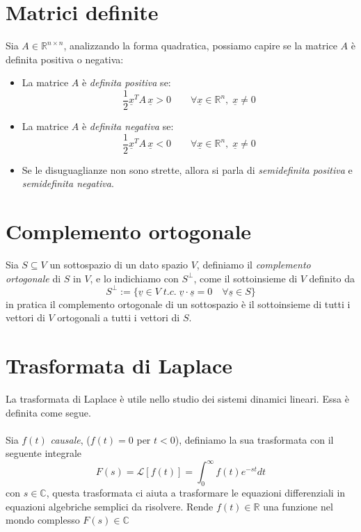 \section{Matrici definite}
Sia $A \in\mathbb{R}^{n \times n}$, analizzando la forma quadratica, possiamo capire se la matrice $A$ è definita positiva o negativa:
\begin{itemize}
	\item La matrice $A$ è \emph{definita positiva} se:
	\begin{equation}
		\frac{1}{2}\underline{x}^TA\,\underline{x} > 0 \qquad\forall\underline{x}\in\mathbb{R}^n,\; \underline{x} \neq 0
	\end{equation}
	\item La matrice $A$ è \emph{definita negativa} se:
	\begin{equation}
		\frac{1}{2}\underline{x}^TA\,\underline{x} < 0 \qquad\forall\underline{x}\in\mathbb{R}^n,\; \underline{x} \neq 0
	\end{equation}
	\item Se le disuguaglianze non sono strette, allora si parla di \emph{semidefinita positiva} e \emph{semidefinita negativa}.
\end{itemize}

\section{Complemento ortogonale}
Sia $S \subseteq V$ un sottospazio di un dato spazio $V$, definiamo il \emph{complemento ortogonale} di $S$ in $V$, e lo indichiamo con $S^{\perp}$, come il sottoinsieme di $V$ definito da
\begin{equation}
	S^{\perp} := \lbrace \underline{v} \in V\; t.c.\; \underline{v} \cdot \underline{s} = 0 \quad \forall\underline{s} \in S  \rbrace
\end{equation}
in pratica il complemento ortogonale di un sottospazio è il sottoinsieme di tutti i vettori di $V$ ortogonali a tutti i vettori di $S$.

\section{Trasformata di Laplace}
La trasformata di Laplace è utile nello studio dei sistemi dinamici lineari. Essa è definita come segue.
\paragraph{}
Sia $f(t)$ \emph{causale}, ($f(t) = 0$ per $t<0$), definiamo la sua trasformata con il seguente integrale
\begin{equation}
	F(s) = \mathcal{L}[f(t)] = \int_0^{\infty} f(t) e^{-st} dt
\end{equation}
con $s \in \mathbb{C}$, questa trasformata ci aiuta a trasformare le equazioni differenziali in equazioni algebriche semplici da risolvere. Rende $f(t) \in \mathbb{R}$ una funzione nel mondo complesso $F(s) \in \mathbb{C}$ 

